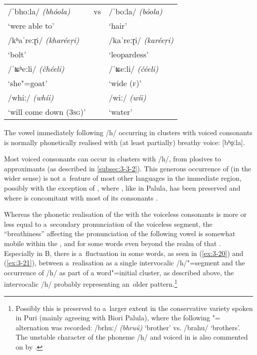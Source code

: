 \begin{exe}
\extab
\label{ex:3-18}
\begin{tabularx}{116mm}{ l l l }
/ˈbhoːla/ \textit{(bhóola)} &
vs &
/ˈboːla/ \textit{(bóola)}\\
`were able to' &
&
`hair'\\
/kʰaˈreːɽi/ \textit{(kharéeṛi)} &
&
/kaˈreːɽi/ \textit{(karéeṛi)}\\
`bolt' &
&
`leopardess'\\
/ˈʨʰeːli/ \textit{(čhéeli)} &
&
/ˈʨeːli/ \textit{(čéeli)}\\
`she"=goat' &
&
`wide (\textsc{f})'\\
/whiː/ \textit{(whíi)} &
&
/wiː/ \textit{(wíi)}\\
`will come down (\textsc{3sg})' &
&
`water'\\
\end{tabularx}
\end{exe}


The vowel immediately following /h/ occurring in clusters with voiced consonants is normally phonetically realised with (at least partially) breathy voice: [bʱo̤ːla]. 


Most voiced consonants can occur in clusters with /h/, from plosives to approximants (as described in \ref{subsec:3-3-2}). This generous occurrence of  (in the wider sense) is not a~feature of most other languages in the immediate region, possibly with the exception of \iliIndusKohistani, where \iliOIA {}, like in Palula, has been preserved and where  is concomitant with most of its consonants \citep[19--25]{hallberghallberg1999}. 


Whereas the phonetic realisation of the  with the voiceless consonants is more or less equal to a~secondary pronunciation of the voiceless segment, the ``breathiness'' affecting the pronunciation of the following vowel is somewhat mobile within the , and for some words even beyond the realm of that . Especially in B, there is a~fluctuation in some words, as seen in (\ref{ex:3-20}) and (\ref{ex:3-21}), between a~realisation as a single intervocalic /h/"=segment and the occurrence of /h/ as part of a word"=initial cluster, as described above, the intervocalic /h/ probably representing an~older pattern.\footnote{Possibly this is preserved to a~larger extent in the conservative variety spoken in Puri (mainly agreeing with Biori Palula), where the following "= alternation was recorded: /brhuː/ \textit{(bhruú)} `brother' vs. /brahu/ `brothers'. The unstable character of the phoneme /h/ and voiced  in \iliKalasha is also commented on by \citet[50]{morchheegaard1997}.}

